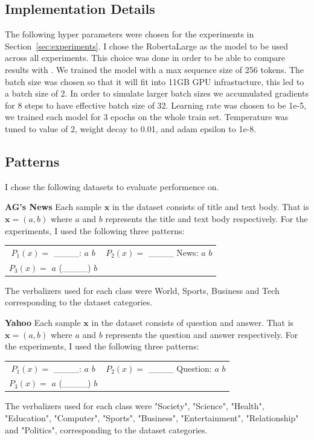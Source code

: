 \documentclass[11pt,a4paper]{article}
\begin{document}
\subsection{Implementation Details}
\label{apx:implementation-details}
The following hyper parameters were chosen for the experiments in Section~\ref{sec:experiments}.
I chose the RobertaLarge as the model to be used across all experiments.
This choice was done in order to be able to compare results with \citet{schick2020exploiting}.
We trained the model with a max sequence size of 256 tokens.
The batch size was chosen so that it will fit into 11GB GPU infrastucture, this led to a batch size of 2. 
In order to simulate larger batch sizes we accumulated gradients for 8 steps to have effective batch size of 32.
Learning rate was chosen to be 1e-5, we trained each model for 3 epochs on the whole train set.
Temperature was tuned to value of 2, weight decay to 0.01, and adam epsilon to 1e-8.

\subsection{Patterns}
\label{apx:patterns}
I chose the following datasets to evaluate performence on.

\vspace{8pt}
\noindent \textbf{AG's News} \quad
Each sample $\textbf{x}$ in the dataset consists of title and text body.
That is $\textbf{x}=(a, b)$ where $a$ and $b$ represents the title and text body respectively.
For the experiments, I used the following three patterns:
\begin{table}[H]
	\renewcommand{\arraystretch}{1.5}
	\begin{tabularx}{\textwidth}{cc}
		 $P_1(x)=$ \_\_\_\_: $a$ $b$ & $P_2(x)=$ \_\_\_\_ News: $a$ $b$ \\
		 $P_3(x)=$ $a$ (\_\_\_\_) $b$ &  \\
	\end{tabularx}
\end{table}
The verbalizers used for each class were World, Sports, Business and Tech corresponding to the dataset categories.

\vspace{8pt}
\noindent \textbf{Yahoo} \quad
Each sample $\textbf{x}$ in the dataset consists of question and answer.
That is $\textbf{x}=(a, b)$ where $a$ and $b$ represents the question and answer respectively.
For the experiments, I used the following three patterns:
\begin{table}[H]
	\renewcommand{\arraystretch}{1.5}
	\begin{tabularx}{\textwidth}{cc}
		$P_1(x)=$ \_\_\_\_: $a$ $b$ & $P_2(x)=$ \_\_\_\_ Question: $a$ $b$ \\
		$P_3(x)=$ $a$ (\_\_\_\_) $b$ &  \\
	\end{tabularx}
\end{table}
The verbalizers used for each class were "Society", "Science", "Health", "Education", "Computer", "Sports", "Business", "Entertainment", "Relationship" and "Politics", corresponding to the dataset categories.
\end{document}
